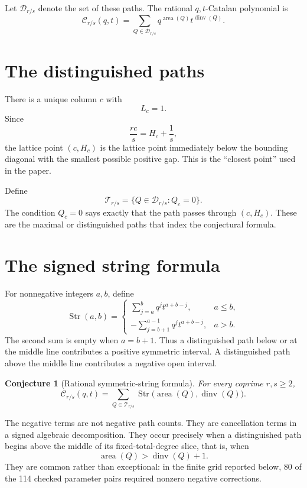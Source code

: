 \documentclass{article}
\newcommand{\area}{\operatorname{area}}
\newcommand{\dinv}{\operatorname{dinv}}
\newcommand{\Cat}{\mathcal C}
\newcommand{\D}{\mathcal D}
\newcommand{\T}{\mathcal T}
\newtheorem{conjecture}{Conjecture}
\begin{document}
Let \(\D_{r/s}\) denote the set of these paths.  The rational
\(q,t\)-Catalan polynomial is
\[
  \Cat_{r/s}(q,t)
  =
  \sum_{Q\in\D_{r/s}}q^{\area(Q)}t^{\dinv(Q)}.
\]

\section{The distinguished paths}

There is a unique column \(c\) with
\[
  L_c=1.
\]
Since
\[
  \frac{rc}{s}=H_c+\frac1s,
\]
the lattice point \((c,H_c)\) is the lattice point immediately below the
bounding diagonal with the smallest possible positive gap.  This is the
``closest point'' used in the paper.

Define
\[
  \T_{r/s}
  =
  \{Q\in\D_{r/s}:Q_c=0\}.
\]
The condition \(Q_c=0\) says exactly that the path passes through
\((c,H_c)\).  These are the maximal or distinguished paths that index the
conjectural formula.

\section{The signed string formula}

For nonnegative integers \(a,b\), define
\[
  \operatorname{Str}(a,b)=
  \begin{cases}
    \displaystyle\sum_{j=a}^{b}q^j t^{a+b-j},&a\le b,\\[3mm]
    \displaystyle-\sum_{j=b+1}^{a-1}q^j t^{a+b-j},&a>b.
  \end{cases}
\]
The second sum is empty when \(a=b+1\).  Thus a distinguished path below or
at the middle line contributes a positive symmetric interval.  A
distinguished path above the middle line contributes a negative open
interval.

\begin{conjecture}[Rational symmetric-string formula]
For every coprime \(r,s\ge2\),
\[
  \Cat_{r/s}(q,t)
  =
  \sum_{Q\in\T_{r/s}}
  \operatorname{Str}\bigl(\area(Q),\dinv(Q)\bigr).
\]
\end{conjecture}

The negative terms are not negative path counts.  They are cancellation terms
in a signed algebraic decomposition.  They occur precisely when a
distinguished path begins above the middle of its fixed-total-degree slice,
that is, when
\[
  \area(Q)>\dinv(Q)+1.
\]
They are common rather than exceptional: in the finite grid reported below,
80 of the 114 checked parameter pairs required nonzero negative corrections.
\end{document}
